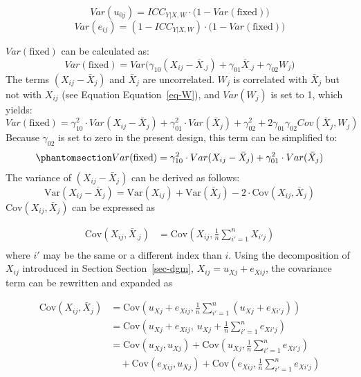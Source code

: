 \documentclass[
  letterpaper,
  11pt,
  english,
  singlespacing,
  headsepline,
  openany]{MastersDoctoralThesis}
\begin{document}
\[
Var(u_{0j}) = ICC_{Y|X,W} \cdot \bigl(1 - Var(\text{fixed})\bigr)
\] \[
Var(e_{ij}) = (1 - ICC_{Y|X,W}) \cdot \bigl(1 - Var(\text{fixed})\bigr)
\]

\(Var(\text{fixed})\) can be calculated as: \[
Var(\text{fixed}) 
= Var\bigl( \gamma_{10} (X_{ij} - \bar{X}_{.j}) 
+ \gamma_{01} \bar{X}_{.j} 
+ \gamma_{02} W_j \bigr)
\] The terms \((X_{ij} - \bar{X}_{j})\) and \(\bar{X}_{j}\) are
uncorrelated. \(W_j\) is correlated with \(\bar{X}_{j}\) but not with
\(X_{ij}\) (see Equation Equation~\ref{eq-W}), and \(Var(W_j)\) is set
to 1, which yields: \[
Var(\text{fixed})
= \gamma_{10}^2 \cdot Var(X_{ij} - \bar{X}_{j})
+ \gamma_{01}^2 \cdot Var(\bar{X}_{j})
+ \gamma_{02}^2
+ 2\gamma_{01}\gamma_{02} Cov(\bar{X}_{j}, W_j)
\] Because \(\gamma_{02}\) is set to zero in the present design, this
term can be simplified to:
\begin{equation}\phantomsection\label{eq-varfix}{
Var(\text{fixed})
= \gamma_{10}^2 \cdot Var(X_{ij} - \bar{X}_{j})
+ \gamma_{01}^2 \cdot Var(\bar{X}_{j})
}\end{equation} The variance of \((X_{ij} - \bar{X}_{j})\) can be
derived as follows: \[
\mathrm{Var}(X_{ij} - \bar{X}_{j})
= \mathrm{Var}(X_{ij}) + \mathrm{Var}(\bar{X}_{j}) - 2 \cdot \mathrm{Cov}(X_{ij}, \bar{X}_{j})
\] \(\mathrm{Cov}(X_{ij}, \bar{X}_{j})\) can be expressed as

\[
\begin{aligned}
\mathrm{Cov}(X_{ij}, \bar{X}_{.j})
&= \mathrm{Cov}\left(X_{ij}, \frac{1}{n} \sum_{i'=1}^{n} X_{i'j} \right) \\
\end{aligned}
\] where \(i'\) may be the same or a different index than \(i\). Using
the decomposition of \(X_{ij}\) introduced in Section
Section~\ref{sec-dgm}, \(X_{ij} = u_{Xj} + e_{Xij}\), the covariance
term can be rewritten and expanded as

\[
\begin{aligned}
\mathrm{Cov}(X_{ij}, \bar{X}_{j})
&= \mathrm{Cov}\left(u_{Xj} + e_{Xij}, \frac{1}{n} \sum_{i'=1}^{n} (u_{Xj} + e_{Xi'j}) \right) \\
&= \mathrm{Cov}\left(u_{Xj} + e_{Xij},\ u_{Xj} + \frac{1}{n} \sum_{i'=1}^{n} e_{Xi'j} \right) \\
&= \mathrm{Cov}(u_{Xj}, u_{Xj})
+ \mathrm{Cov}\left(u_{Xj}, \frac{1}{n} \sum_{i'=1}^{n} e_{Xi'j}\right) \\
&\quad + \mathrm{Cov}(e_{Xij}, u_{Xj})
+ \mathrm{Cov}\left(e_{Xij}, \frac{1}{n} \sum_{i'=1}^{n} e_{Xi'j}\right)
\end{aligned}
\]
\end{document}
